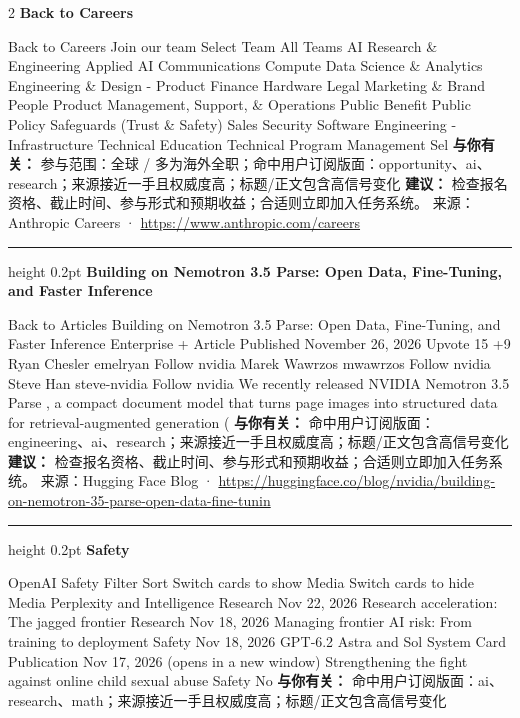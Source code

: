 \documentclass[10.5pt]{ctexart}
\begin{document}
\begin{multicols}{2}
{\large\bfseries Back to Careers}\par
Back to Careers Join our team Select Team All Teams AI Research \& Engineering Applied AI Communications Compute Data Science \& Analytics Engineering \& Design - Product Finance Hardware Legal Marketing \& Brand People Product Management, Support, \& Operations Public Benefit Public Policy Safeguards (Trust \& Safety) Sales Security Software Engineering - Infrastructure Technical Education Technical Program Management Sel
\textbf{与你有关：} 参与范围：全球 / 多为海外全职；命中用户订阅版面：opportunity、ai、research；来源接近一手且权威度高；标题/正文包含高信号变化
\textbf{建议：} 检查报名资格、截止时间、参与形式和预期收益；合适则立即加入任务系统。
{\footnotesize\color{ormuted} 来源：Anthropic Careers · \url{https://www.anthropic.com/careers}}
\vspace{2mm}
\hrule height 0.2pt
\vspace{2mm}
{\large\bfseries Building on Nemotron 3.5 Parse: Open Data, Fine-Tuning, and Faster Inference}\par
Back to Articles Building on Nemotron 3.5 Parse: Open Data, Fine-Tuning, and Faster Inference Enterprise + Article Published November 26, 2026 Upvote 15 +9 Ryan Chesler emelryan Follow nvidia Marek Wawrzos mwawrzos Follow nvidia Steve Han steve-nvidia Follow nvidia We recently released NVIDIA Nemotron 3.5 Parse , a compact document model that turns page images into structured data for retrieval-augmented generation (
\textbf{与你有关：} 命中用户订阅版面：engineering、ai、research；来源接近一手且权威度高；标题/正文包含高信号变化
\textbf{建议：} 检查报名资格、截止时间、参与形式和预期收益；合适则立即加入任务系统。
{\footnotesize\color{ormuted} 来源：Hugging Face Blog · \url{https://huggingface.co/blog/nvidia/building-on-nemotron-35-parse-open-data-fine-tunin}}
\vspace{2mm}
\hrule height 0.2pt
\vspace{2mm}
{\large\bfseries Safety}\par
OpenAI Safety Filter Sort Switch cards to show Media Switch cards to hide Media Perplexity and Intelligence Research Nov 22, 2026 Research acceleration: The jagged frontier Research Nov 18, 2026 Managing frontier AI risk: From training to deployment Safety Nov 18, 2026 GPT‑6.2 Astra and Sol System Card Publication Nov 17, 2026 (opens in a new window) Strengthening the fight against online child sexual abuse Safety No
\textbf{与你有关：} 命中用户订阅版面：ai、research、math；来源接近一手且权威度高；标题/正文包含高信号变化

\end{multicols}
\end{document}
